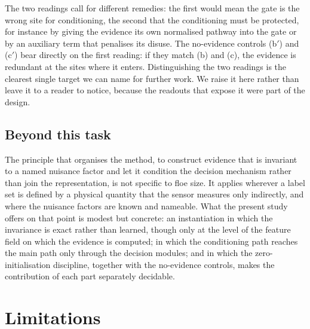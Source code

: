 \documentclass[preprint,12pt,authoryear]{elsarticle}
\begin{document}
The two readings call for different remedies: the first would mean the gate
is the wrong site for conditioning, the second that the conditioning must be
protected, for instance by giving the evidence its own normalised pathway into
the gate or by an auxiliary term that penalises its disuse. The no-evidence
controls (b$'$) and (c$'$) bear directly on the first reading: if they match (b)
and (c), the evidence is redundant at the sites where it enters. Distinguishing
the two readings
is the clearest single target we can name for further work. We raise it here
rather than leave it to a reader to notice, because the readouts that expose it
were part of the design.

\subsection{Beyond this task}

The principle that organises the method, to construct evidence that is
invariant to a named nuisance factor and let it condition the decision
mechanism rather than join the representation, is not specific to floe size. It applies
wherever a label set is defined by a physical quantity that the sensor measures
only indirectly, and where the nuisance factors are known and nameable. What the
present study offers on that point is modest but concrete: an instantiation in
which the invariance is exact rather than learned, though only at the level of
the feature field on which the evidence is computed; in which the conditioning
path reaches the main path only through the decision modules; and in which the
zero-initialisation discipline, together with the no-evidence controls, makes
the contribution of each part separately decidable.

\section{Limitations}
\label{sec:limitations}
\end{document}
